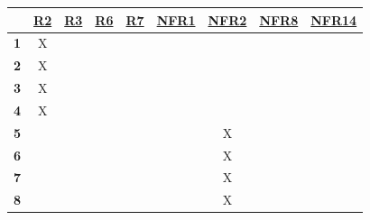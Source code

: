 \documentclass[12pt, titlepage]{article}
\begin{document}
\noindent
\begin{table}
  \centering
  \begin{tabular}{|c|c|c|c|c|c|c|c|c|}
    \hline
                 & \href{https://github.com/zakerl/Capstone_Project/blob/main/docs/SRS/SRS.pdf}{R2} & \href{https://github.com/zakerl/Capstone_Project/blob/main/docs/SRS/SRS.pdf}{R3} & \href{https://github.com/zakerl/Capstone_Project/blob/main/docs/SRS/SRS.pdf}{R6} & \href{https://github.com/zakerl/Capstone_Project/blob/main/docs/SRS/SRS.pdf}{R7} & \href{https://github.com/zakerl/Capstone_Project/blob/main/docs/SRS/SRS.pdf}{NFR1} & \href{https://github.com/zakerl/Capstone_Project/blob/main/docs/SRS/SRS.pdf}{NFR2} & \href{https://github.com/zakerl/Capstone_Project/blob/main/docs/SRS/SRS.pdf}{NFR8} & \href{https://github.com/zakerl/Capstone_Project/blob/main/docs/SRS/SRS.pdf}{NFR14} \\
    \hline
    \textbf{1}  &X                    &                     &                     &                     &                       &                       &                       & \\ \hline
    \textbf{2}  &X                     &                     &                     &                     &                       &                       &                       &                   \\ \hline
    \textbf{3}  & X                    &                   &                     &                     &                       &                       &                       & \\ \hline
    \textbf{4}  &  X                   &                     &                     &                     &                     &                    &                       &   \\ \hline
    \textbf{5}  &                     &                     &                     &                     &                       &X                       &                      &   \\ \hline
    \textbf{6}  &                     &                     &                     &                     &                       &  X                     &                      & \\ \hline
    \textbf{7}  &                    &                    &                    &                   &                       &     X                  &                       & \\ \hline
    \textbf{8}  &                     &                     &                     &                     &                       &  X                     &                       &                     \\ \hline

\end{tabular}
\end{table}
\end{document}
